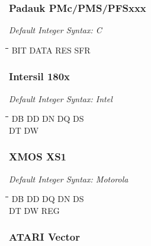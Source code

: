 \subsubsection{Padauk PMc/PMS/PFSxxx}

{\em Default Integer Syntax: C}

{\tt\begin{tabbing}
\hspace{3cm}\=\hspace{3cm}\=\hspace{3cm}\=\hspace{3cm}\=\kill
BIT        \> DATA       \> RES       \> SFR \\
\end{tabbing}}

\subsubsection{Intersil 180x}

{\em Default Integer Syntax: Intel}

{\tt\begin{tabbing}
\hspace{3cm}\=\hspace{3cm}\=\hspace{3cm}\=\hspace{3cm}\=\kill
DB         \> DD          \> DN          \> DQ          \> DS \\
DT         \> DW \\
\end{tabbing}}


\subsubsection{XMOS XS1}

{\em Default Integer Syntax: Motorola}

{\tt\begin{tabbing}
\hspace{3cm}\=\hspace{3cm}\=\hspace{3cm}\=\hspace{3cm}\=\kill
DB         \> DD          \> DQ          \> DN          \> DS \\
DT         \> DW          \> REG \\
\end{tabbing}}

\subsubsection{ATARI Vector}

